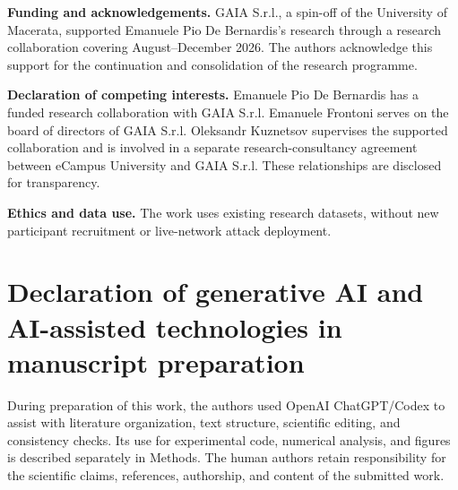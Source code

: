 \noindent\textbf{Funding and acknowledgements.} GAIA S.r.l., a spin-off of the University of Macerata, supported Emanuele Pio De Bernardis's research through a research collaboration covering August--December 2026. The authors acknowledge this support for the continuation and consolidation of the research programme.

\noindent\textbf{Declaration of competing interests.} Emanuele Pio De Bernardis has a funded research collaboration with GAIA S.r.l. Emanuele Frontoni serves on the board of directors of GAIA S.r.l. Oleksandr Kuznetsov supervises the supported collaboration and is involved in a separate research-consultancy agreement between eCampus University and GAIA S.r.l. These relationships are disclosed for transparency.

\noindent\textbf{Ethics and data use.} The work uses existing research datasets, without new participant recruitment or live-network attack deployment.

\section*{Declaration of generative AI and AI-assisted technologies in manuscript preparation}
During preparation of this work, the authors used OpenAI ChatGPT/Codex to assist with literature organization, text structure, scientific editing, and consistency checks. Its use for experimental code, numerical analysis, and figures is described separately in Methods. The human authors retain responsibility for the scientific claims, references, authorship, and content of the submitted work.

\FloatBarrier
\begingroup\footnotesize\raggedright

\endgroup

